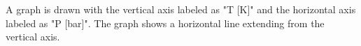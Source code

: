 A graph is drawn with the vertical axis labeled as "T [K]" and the horizontal axis labeled as "P [bar]". The graph shows a horizontal line extending from the vertical axis.